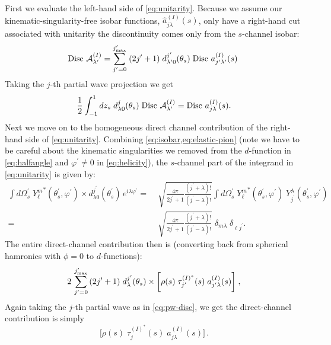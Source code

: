 First we evaluate the left-hand side of \cref{eq:unitarity}. Because we assume our kinematic-singularity-free isobar functions, \(\hat{a}^{(I)}_{j \lambda}(s)\), only have a right-hand cut associated with unitarity the discontinuity comes only from the \(s\)-channel isobar:
  \begin{equation}
    \label{eq:discontinuity}
    \text{Disc } \mathcal{A}^{(I)}_{\lambda^\prime} = \sum_{j^\prime=0}^{j^\prime_\text{max}} \; (2 j^\prime +1)
    \; d^{j^\prime}_{{\lambda^\prime} 0}(\theta_s) \; \text{Disc } a^{(I)}_{{j^\prime} {\lambda^\prime}}(s) \;
  \end{equation}
Taking the \(j\)-th partial wave projection we get
  \begin{equation}
    \label{eq:pw-disc}
    \frac{1}{2} \int_{-1}^1 dz_s  \; d^j_{\lambda 0}(\theta_s) \; \text{Disc } \mathcal{A}^{(I)}_{\lambda^\prime} =
    \text{Disc } a^{(I)}_{j\lambda}(s).
  \end{equation}
Next we move on to the homogeneous direct channel contribution of the right-hand side of \cref{eq:unitarity}. Combining \cref{eq:isobar,eq:elastic-pion} (note we have to be careful about the kinematic singularities we removed from the \(d\)-function in \cref{eq:halfangle} and \(\varphi^\prime \not= 0\) in \cref{eq:helicity}),
 the \(s\)-channel part of the integrand in \cref{eq:unitarity} is given by:
  \begin{align}
      \label{eq:direct-channel-angle}
     \int d\Omega_s^\prime \; {Y^m_\ell}^*(\theta_s^\prime, \varphi^\prime) \times d_{\lambda0}^{j^\prime}(\theta_s^\prime) \, e^{i\lambda \varphi^\prime} =&
     \; \sqrt{\frac{4\pi}{2j^\prime+1}\frac{(j^\prime+\lambda)!}{(j^\prime-\lambda)!}} \int d\Omega_s^\prime \; {Y^m_\ell}^*(\theta_s^\prime, \varphi^\prime) \;  Y^\lambda_{j^\prime}(\theta_s^\prime, \varphi^\prime) \nonumber \\
    =& \;  \sqrt{\frac{4\pi}{2j^\prime+1}\frac{(j^\prime+\lambda)!}{(j^\prime-\lambda)!}} \;  \delta_{m\lambda} \; \delta_{\ell j^\prime}.
  \end{align}
The entire direct-channel contribution then is (converting back from spherical hamronics with \(\phi = 0\) to \(d\)-functions):
  \begin{align}
     2 \,  \sum_{{j^\prime}=0}^{j^\prime_\text{max}}  \,
       (2{j^\prime} +1) \; d_\lambda^{j^\prime}(\theta_s)
        \times
        \bigg[\rho(s) \; \tau^{(I)^*}_{j^\prime}(s) \; a^{(I)}_{{j^\prime}\lambda}(s) \bigg ]
        \; ,
  \end{align}
Again taking the \(j\)-th partial wave as in \cref{eq:pw-disc}, we get the direct-channel contribution is simply
  \begin{equation}
    \label{eq:pw-direct}
    \bigg[
    \rho(s) \; {\tau}^{(I)^*}_j(s) \; a^{(I)}_{j\lambda}(s)
    \bigg] \, .
  \end{equation}
